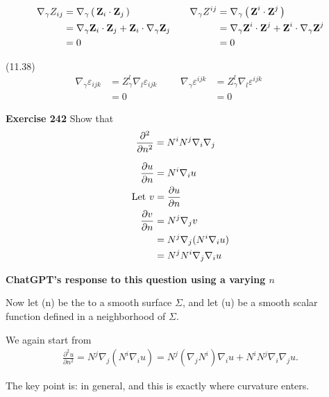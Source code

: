 \documentclass[12pt,a4paper]{report}
\newcommand{\BLUE}[1]{\textcolor{blue}{#1}}
\begin{document}
{\begin{description}
	\begin{align*}
		\nabla_\gamma Z_{ij} &= \nabla_\gamma \left (\, \textbf{Z}_i \cdot \textbf{Z}_j \,\right ) & && \nabla_\gamma Z^{ij} &= \nabla_\gamma \left (\, \textbf{Z}^i \cdot \textbf{Z}^j \,\right ) \\
		&= \nabla_\gamma \textbf{Z}_i \cdot \textbf{Z}_j + \textbf{Z}_i \cdot \nabla_\gamma \textbf{Z}_j & && &= \nabla_\gamma \textbf{Z}^i \cdot \textbf{Z}^j + \textbf{Z}^i \cdot \nabla_\gamma \textbf{Z}^j \\
		&= 0 & && &= 0
	\end{align*}
	\item (11.38)
	\begin{align*}
		\nabla_\gamma\varepsilon_{ijk} &= Z_\gamma^l \nabla_l \varepsilon_{ijk} &
		&& \nabla_\gamma\varepsilon^{ijk} &= Z_\gamma^l \nabla_l \varepsilon^{ijk} & && \\
		&= 0 & && &= 0
	\end{align*}
\end{description}
}

\textbf{Exercise 242} Show that 
\begin{align*}
	\frac{\partial^2 }{\partial n^2} &= N^iN^j\nabla_i\nabla_j
\end{align*}
	
	\BLUE{\begin{align*}
			\frac{\partial u}{\partial n} &= N^i\nabla_i u \\
			\text{Let } v &= \frac{\partial u}{\partial n}\\
			\frac{\partial v}{\partial n} &= N^j\nabla_j v \\
				&= N^j \nabla_j (N^i\nabla_i u) \\
				&= N^jN^i \nabla_j\nabla_i u
		\end{align*}	
	}

\HLINE
\textbf{ChatGPT's response to this question using a varying $n$}

Now let (n) be the  to a smooth surface $\Sigma$, and let (u) be a smooth scalar function defined in a neighborhood of $\Sigma$.

We again start from
\begin{align*}
\frac{\partial^2 u}{\partial n^2} = N^j \nabla_j (N^i \nabla_i u) = N^j (\nabla_j N^i)\nabla_i u + N^i N^j \nabla_i \nabla_j u.
\end{align*}

The key point is:  in general, and this is exactly where curvature enters.
\end{document}
